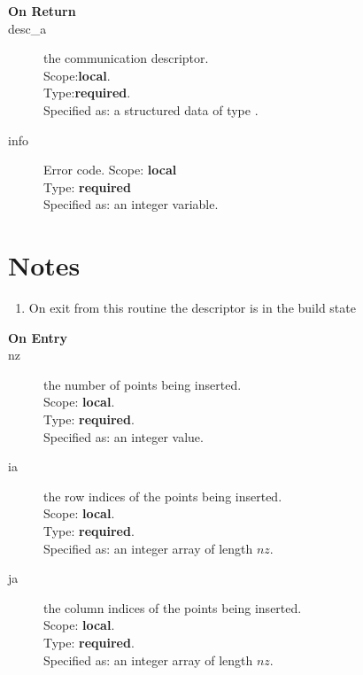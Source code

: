 \begin{description}
\item[\bf On Return]
\item[desc\_a] the communication descriptor.\\
Scope:{\bf local}.\\
Type:{\bf required}.\\
Specified as: a structured data of type \descdata.
\item[info] Error code.
Scope: {\bf local} \\
Type: {\bf required}\\
Specified as: an integer variable.\\
\end{description}

\section*{Notes}
\begin{enumerate}
\item On exit from this routine the descriptor is in the build state
\end{enumerate}


%
%


\begin{description}
\item[\bf On Entry]
\item[nz] the number of points being inserted.\\
Scope: {\bf local}.\\
Type: {\bf required}.\\
Specified as: an integer value.
\item[ia] the row indices of the points being inserted.\\
Scope: {\bf local}.\\
Type: {\bf required}.\\
Specified as: an integer array of length $nz$.
\item[ja] the column indices of the points being inserted.\\
Scope: {\bf local}.\\
Type: {\bf required}.\\
Specified as: an integer array of length $nz$.
\end{description}

